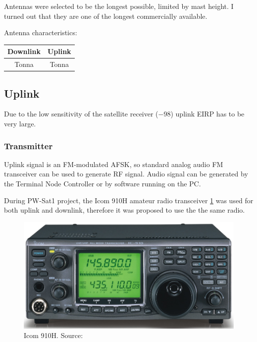 
Antennas were selected to be the longest possible, limited by mast height. I turned out that they are one of the longest commercially available. 

Antenna characteristics:

\begin{tabular}{c|c}
     \textbf{Downlink} & \textbf{Uplink} \\ \hline
     Tonna & Tonna \\
\end{tabular}


\subsection{Uplink}
Due to the low sensitivity of the satellite receiver (\SI{-98}{\dBm}) uplink EIRP has to be very large.
\subsubsection{Transmitter}
Uplink signal is an FM-modulated AFSK, so standard analog audio FM transceiver can be used to generate RF signal. Audio signal can be generated by the Terminal Node Controller or by software running on the PC.

During PW-Sat1 project, the Icom 910H amateur radio transceiver \ref{Icom_910H_ref} was used for both uplink and downlink, therefore it was proposed to use the the same radio.

\begin{figure}[H]
    \centering
    \includegraphics[width=0.6\paperwidth]{img/2/icom910h.jpg}
    \caption{Icom 910H. Source: \cite{ICOM_910H_pic}}
    \label{Icom_910H_ref}
\end{figure}

